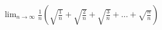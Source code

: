 \item $\displaystyle \lim_{n \to \infty} \frac{1}{n} \left( \sqrt{\frac{1}{n}} + \sqrt{\frac{2}{n}} + \sqrt{\frac{3}{n}} + \dots + \sqrt{\frac{n}{n}} \right)$
